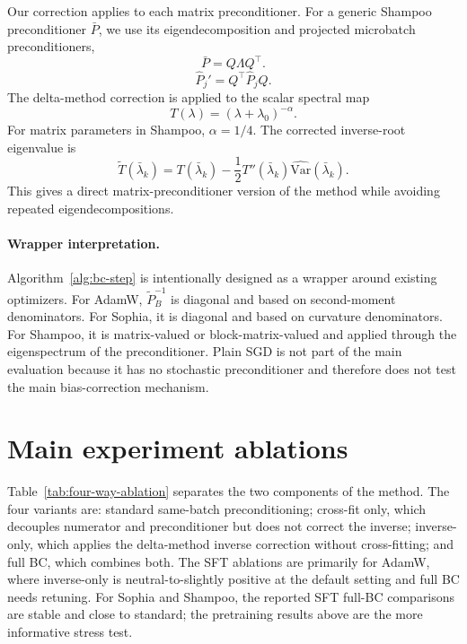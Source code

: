 \documentclass{article}
\newcommand{\Var}{\mathrm{Var}}
\begin{document}
Our correction applies to each matrix preconditioner. For a generic Shampoo preconditioner $\bar P$, we use its eigendecomposition and projected microbatch preconditioners,
\begin{equation}
    \bar P = Q\Lambda Q^\top.
\end{equation}
\begin{equation}
    \hat P_j' = Q^\top \hat P_j Q.
\end{equation}
The delta-method correction is applied to the scalar spectral map
\begin{equation}
    T(\lambda) = (\lambda+\lambda_0)^{-\alpha}.
\end{equation}
For matrix parameters in Shampoo, $\alpha=1/4$. The corrected inverse-root eigenvalue is
\begin{equation}
    \widetilde T(\bar \lambda_k)
    =
    T(\bar \lambda_k)
    -
    \frac{1}{2}T''(\bar \lambda_k)\widehat{\Var}(\bar \lambda_k).
\end{equation}
This gives a direct matrix-preconditioner version of the method while avoiding repeated eigendecompositions.

\paragraph{Wrapper interpretation.}
Algorithm~\ref{alg:bc-step} is intentionally designed as a wrapper around existing optimizers. For AdamW, $\widetilde P_B^{-1}$ is diagonal and based on second-moment denominators. For Sophia, it is diagonal and based on curvature denominators. For Shampoo, it is matrix-valued or block-matrix-valued and applied through the eigenspectrum of the preconditioner. Plain SGD is not part of the main evaluation because it has no stochastic preconditioner and therefore does not test the main bias-correction mechanism.

\section{Main experiment ablations}
\label{app:bias-correction-ablations}

Table~\ref{tab:four-way-ablation} separates the two components of the method. The four variants are: standard same-batch preconditioning; cross-fit only, which decouples numerator and preconditioner but does not correct the inverse; inverse-only, which applies the delta-method inverse correction without cross-fitting; and full BC, which combines both. The SFT ablations are primarily for AdamW, where inverse-only is neutral-to-slightly positive at the default setting and full BC needs retuning. For Sophia and Shampoo, the reported SFT full-BC comparisons are stable and close to standard; the pretraining results above are the more informative stress test.
\end{document}
